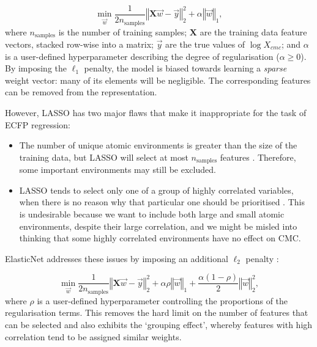 \begin{equation}
    \min_{\vec{w}} { \frac{1}{2n_{\text{samples}}} \left \Vert \mathbf{X}\vec{w} - \vec{y} \right \Vert_2 ^ 2 + \alpha \left \Vert \vec{w} \right \Vert_1},
\end{equation}
where $n_{\text{samples}}$ is the number of training samples; $\mathbf{X}$ are
the training data feature vectors, stacked row-wise into a matrix; $\vec{y}$ are
the true values of $\log X_{cmc}$; and $\alpha$ is a user-defined hyperparameter
describing the degree of regularisation ($\alpha \geq 0$). By imposing the $\ell_1$ penalty, the
model is biased towards learning a \emph{sparse} weight vector: many of its
elements will be negligible. The corresponding features can be removed from the
representation.

However, LASSO has two major flaws that make it inappropriate for the task of
ECFP regression:

\begin{itemize}
    \item The number of unique atomic environments is greater than the size of
          the training data, but LASSO will select at most $n_\text{samples}$ features
          \cite{efronLeastAngleRegression2004}. Therefore, some important environments
          may still be excluded.
    \item LASSO tends to select only one of a group of highly correlated
          variables, when there is no reason why that particular one should be
          prioritised \cite{zouRegularizationVariableSelection2005}. This is
          undesirable because we want to include both large and small atomic
          environments, despite their large correlation, and we might be misled into
          thinking that some highly correlated environments have no effect on CMC.
\end{itemize}

ElasticNet addresses these issues by imposing an additional $\ell_2$ penalty \cite{zouRegularizationVariableSelection2005}:

\begin{equation}
    \label{eq:elastic}
    \min_{\vec{w}} { \frac{1}{2n_{\text{samples}}} \left \Vert \mathbf{X}\vec{w} - \vec{y} \right \Vert_2 ^ 2 + \alpha\rho \left \Vert \vec{w} \right \Vert_1} + \frac{\alpha(1 - \rho)}{2} \left \Vert \vec{w} \right \Vert_2^2,
\end{equation}
where $\rho$ is a user-defined hyperparameter controlling the proportions of the
regularisation terms. This removes the hard limit on the number of features that can be
selected and also exhibits the `grouping effect', whereby features with high correlation
tend to be assigned similar weights.

